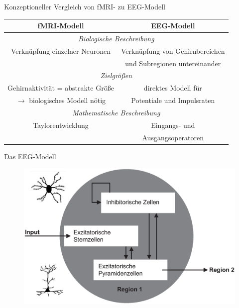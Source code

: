 \documentclass{beamer}
\begin{document}
\begin{frame}{Konzeptioneller Vergleich von fMRI- zu EEG-Modell}
\hspace*{-0.03 \textwidth}
\begin{tabular}{| c | c |}
\hline
\textbf{fMRI-Modell} & \textbf{EEG-Modell} \\
\hline
\multicolumn{2}{c}{\textit{Biologische Beschreibung}} \\
\hline
Verknüpfung einzelner Neuronen & Verknüpfung von Gehirnbereichen \\
&  und Subregionen untereinander \\
\hline
\multicolumn{2}{c}{\textit{Zielgrößen}} \\
\hline
Gehirnaktivität = abstrakte Größe & direktes Modell für \\
$\rightarrow$ biologisches Modell nötig & Potentiale und Impulsraten\\
\hline
\multicolumn{2}{c}{\textit{Mathematische Beschreibung}} \\
\hline
Taylorentwicklung & Eingangs- und \\
&  Ausgangsoperatoren \\
\hline
\end{tabular}
\end{frame}

\begin{frame}{Das EEG-Modell}
\begin{figure}
\centering
\includegraphics[scale=0.4]{res/160711EEGModell1.eps}
\end{figure}
\end{frame}
\end{document}
